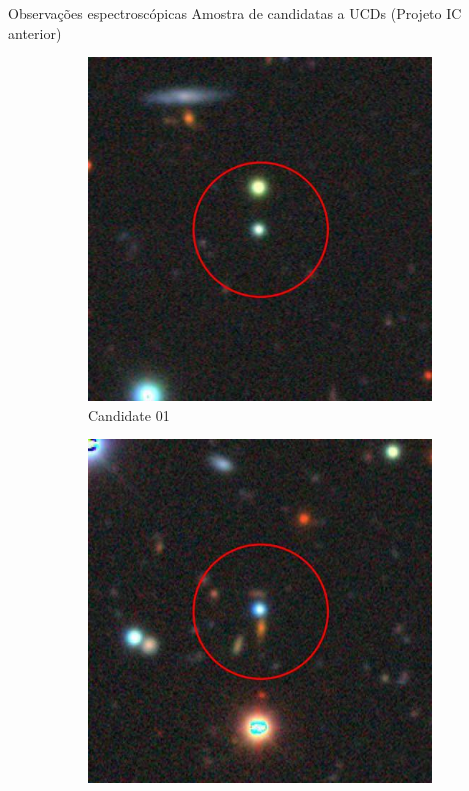 \begin{frame}[c]{Observações espectroscópicas}
Amostra de candidatas a UCDs ({\scriptsize Projeto IC anterior})
\vspace{-0.3cm}
\begin{figure}
    \captionsetup{justification=centering}
    \centering
    \begin{subfigure}[b]{0.11\textwidth}
        \includegraphics[width=\textwidth]{images/proposatal_candidatas_1/UCG01.png}
        \caption{Candidate 01}
    \end{subfigure}
    \begin{subfigure}[b]{0.11\textwidth}
        \includegraphics[width=\textwidth]{images/proposatal_candidatas_1/UCG02.png}

\end{subfigure}
\end{figure}
\end{frame}
